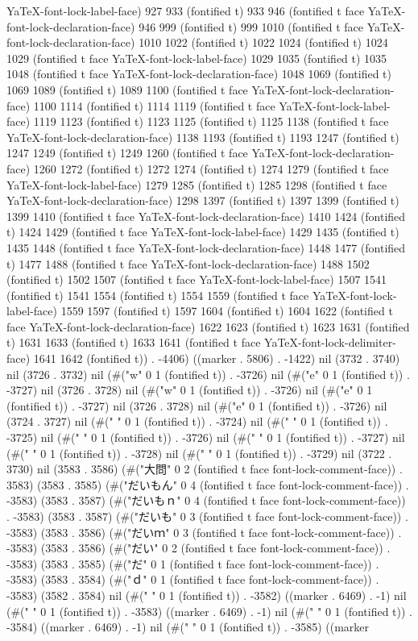 YaTeX-font-lock-label-face) 927 933 (fontified t) 933 946 (fontified t face YaTeX-font-lock-declaration-face) 946 999 (fontified t) 999 1010 (fontified t face YaTeX-font-lock-declaration-face) 1010 1022 (fontified t) 1022 1024 (fontified t) 1024 1029 (fontified t face YaTeX-font-lock-label-face) 1029 1035 (fontified t) 1035 1048 (fontified t face YaTeX-font-lock-declaration-face) 1048 1069 (fontified t) 1069 1089 (fontified t) 1089 1100 (fontified t face YaTeX-font-lock-declaration-face) 1100 1114 (fontified t) 1114 1119 (fontified t face YaTeX-font-lock-label-face) 1119 1123 (fontified t) 1123 1125 (fontified t) 1125 1138 (fontified t face YaTeX-font-lock-declaration-face) 1138 1193 (fontified t) 1193 1247 (fontified t) 1247 1249 (fontified t) 1249 1260 (fontified t face YaTeX-font-lock-declaration-face) 1260 1272 (fontified t) 1272 1274 (fontified t) 1274 1279 (fontified t face YaTeX-font-lock-label-face) 1279 1285 (fontified t) 1285 1298 (fontified t face YaTeX-font-lock-declaration-face) 1298 1397 (fontified t) 1397 1399 (fontified t) 1399 1410 (fontified t face YaTeX-font-lock-declaration-face) 1410 1424 (fontified t) 1424 1429 (fontified t face YaTeX-font-lock-label-face) 1429 1435 (fontified t) 1435 1448 (fontified t face YaTeX-font-lock-declaration-face) 1448 1477 (fontified t) 1477 1488 (fontified t face YaTeX-font-lock-declaration-face) 1488 1502 (fontified t) 1502 1507 (fontified t face YaTeX-font-lock-label-face) 1507 1541 (fontified t) 1541 1554 (fontified t) 1554 1559 (fontified t face YaTeX-font-lock-label-face) 1559 1597 (fontified t) 1597 1604 (fontified t) 1604 1622 (fontified t face YaTeX-font-lock-declaration-face) 1622 1623 (fontified t) 1623 1631 (fontified t) 1631 1633 (fontified t) 1633 1641 (fontified t face YaTeX-font-lock-delimiter-face) 1641 1642 (fontified t)) . -4406) ((marker . 5806) . -1422) nil (3732 . 3740) nil (3726 . 3732) nil (#("w" 0 1 (fontified t)) . -3726) nil (#("e" 0 1 (fontified t)) . -3727) nil (3726 . 3728) nil (#("w" 0 1 (fontified t)) . -3726) nil (#("e" 0 1 (fontified t)) . -3727) nil (3726 . 3728) nil (#("e" 0 1 (fontified t)) . -3726) nil (3724 . 3727) nil (#(" " 0 1 (fontified t)) . -3724) nil (#(" " 0 1 (fontified t)) . -3725) nil (#(" " 0 1 (fontified t)) . -3726) nil (#(" " 0 1 (fontified t)) . -3727) nil (#(" " 0 1 (fontified t)) . -3728) nil (#(" " 0 1 (fontified t)) . -3729) nil (3722 . 3730) nil (3583 . 3586) (#("大問" 0 2 (fontified t face font-lock-comment-face)) . 3583) (3583 . 3585) (#("だいもん" 0 4 (fontified t face font-lock-comment-face)) . -3583) (3583 . 3587) (#("だいもｎ" 0 4 (fontified t face font-lock-comment-face)) . -3583) (3583 . 3587) (#("だいも" 0 3 (fontified t face font-lock-comment-face)) . -3583) (3583 . 3586) (#("だいｍ" 0 3 (fontified t face font-lock-comment-face)) . -3583) (3583 . 3586) (#("だい" 0 2 (fontified t face font-lock-comment-face)) . -3583) (3583 . 3585) (#("だ" 0 1 (fontified t face font-lock-comment-face)) . -3583) (3583 . 3584) (#("ｄ" 0 1 (fontified t face font-lock-comment-face)) . -3583) (3582 . 3584) nil (#(" " 0 1 (fontified t)) . -3582) ((marker . 6469) . -1) nil (#(" " 0 1 (fontified t)) . -3583) ((marker . 6469) . -1) nil (#(" " 0 1 (fontified t)) . -3584) ((marker . 6469) . -1) nil (#(" " 0 1 (fontified t)) . -3585) ((marker 